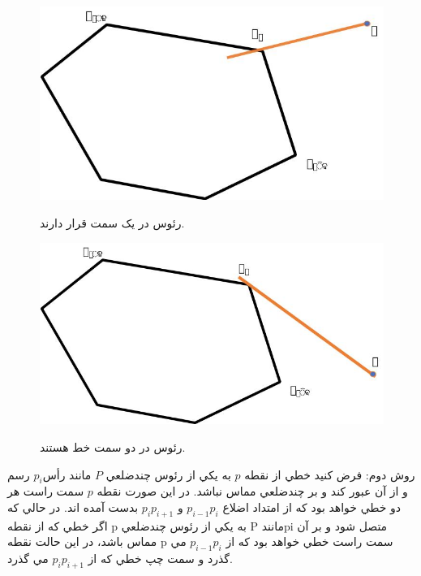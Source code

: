 \documentclass{book}
\begin{document}
\begin{figure}[h!]
    \begin{center}
        \includegraphics[width=\linewidth]{momas_2.jpg}
        \label{momas_2}
        \caption{رئوس در يک سمت قرار دارند.}
    \end{center}
\end{figure}

\begin{figure}[h!]
    \begin{center}
        \includegraphics[width=\linewidth]{momas_1.jpg}
        \label{momas_2}
        \caption{رئوس در دو سمت خط هستند.}
    \end{center}
\end{figure}

روش دوم: فرض کنيد خطي از نقطه $p$ به يکي از رئوس چندضلعي $P$ مانند رأس$p_i$  رسم و از آن عبور کند و بر چندضلعي مماس نباشد. در اين صورت نقطه $p$ سمت راست هر دو ‌خطي خواهد بود که از امتداد اضلاع $p_{i-1}p_i$ و $p_ip_{i+1}$ بدست آمده اند. در حالي‌ که اگر خطي که از نقطه p  به يکي از رئوس چندضلعي P مانندpi  متصل شود و بر آن مماس باشد، در اين حالت نقطه p سمت راست خطي خواهد بود که از $p_{i-1}p_i$ مي گذرد و سمت چپ خطي که از $p_ip_{i+1}$ مي گذرد.
\end{document}
